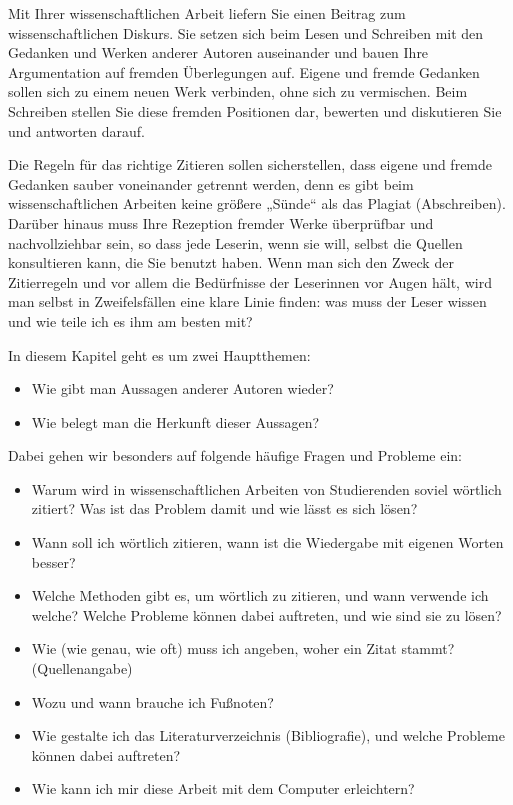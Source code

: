 \documentclass[]{book}
\providecommand{\tightlist}{%
  \setlength{\itemsep}{0pt}\setlength{\parskip}{0pt}}
\theoremstyle{definition}
\theoremstyle{definition}
\theoremstyle{definition}
\theoremstyle{remark}
\begin{document}
Mit Ihrer wissenschaftlichen Arbeit liefern Sie einen Beitrag zum
wissenschaftlichen Diskurs. Sie setzen sich beim Lesen und Schreiben mit
den Gedanken und Werken anderer Autoren auseinander und bauen Ihre
Argumentation auf fremden Überlegungen auf. Eigene und fremde Gedanken
sollen sich zu einem neuen Werk verbinden, ohne sich zu vermischen. Beim
Schreiben stellen Sie diese fremden Positionen dar, bewerten und
diskutieren Sie und antworten darauf.

Die Regeln für das richtige Zitieren sollen sicherstellen, dass eigene
und fremde Gedanken sauber voneinander getrennt werden, denn es gibt
beim wissenschaftlichen Arbeiten keine größere „Sünde`` als das Plagiat
(Abschreiben). Darüber hinaus muss Ihre Rezeption fremder Werke
überprüfbar und nachvollziehbar sein, so dass jede Leserin, wenn sie
will, selbst die Quellen konsultieren kann, die Sie benutzt haben. Wenn
man sich den Zweck der Zitierregeln und vor allem die Bedürfnisse der
Leserinnen vor Augen hält, wird man selbst in Zweifelsfällen eine klare
Linie finden: was muss der Leser wissen und wie teile ich es ihm am
besten mit?

In diesem Kapitel geht es um zwei Hauptthemen:

\begin{itemize}
\tightlist
\item
  Wie gibt man Aussagen anderer Autoren wieder?
\item
  Wie belegt man die Herkunft dieser Aussagen?
\end{itemize}

Dabei gehen wir besonders auf folgende häufige Fragen und Probleme ein:

\begin{itemize}
\tightlist
\item
  Warum wird in wissenschaftlichen Arbeiten von Studierenden soviel
  wörtlich zitiert? Was ist das Problem damit und wie lässt es sich
  lösen?
\item
  Wann soll ich wörtlich zitieren, wann ist die Wiedergabe mit eigenen
  Worten besser?
\item
  Welche Methoden gibt es, um wörtlich zu zitieren, und wann verwende
  ich welche? Welche Probleme können dabei auftreten, und wie sind sie
  zu lösen?
\item
  Wie (wie genau, wie oft) muss ich angeben, woher ein Zitat stammt?
  (Quellenangabe)
\item
  Wozu und wann brauche ich Fußnoten?
\item
  Wie gestalte ich das Literaturverzeichnis (Bibliografie), und welche
  Probleme können dabei auftreten?
\item
  Wie kann ich mir diese Arbeit mit dem Computer erleichtern?
\end{itemize}
\end{document}
